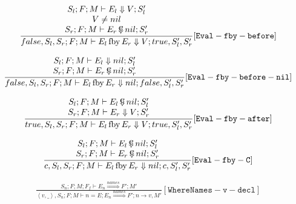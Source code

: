 \documentclass{scrartcl}
\DeclareMathOperator{\fby}{fby}
\DeclareMathOperator{\ceval}{\overset{C}{\smash{\Downarrow}}}
\begin{document}
    \begin{align*}
    \frac{
        \begin{matrix}
        S_l; F; M \vdash E_l \Downarrow V; S_l' \\
        V \neq nil \\
        S_r; F; M \vdash E_r  \ceval nil; S_r'
        \end{matrix}
    }{
        false, S_l, S_r; F; M \vdash E_l \fby E_r \Downarrow V; true, S_l', S_r'
    }[\mathtt{Eval-fby-before}]
    \end{align*}
    
    \begin{align*}
    \frac{
        \begin{matrix}
        S_l; F; M \vdash E_l \Downarrow nil; S_l' \\
        S_r; F; M \vdash E_r  \ceval nil; S_r'
        \end{matrix}
    }{
        false, S_l, S_r; F; M \vdash E_l \fby E_r \Downarrow nil; false, S_l', S_r'
    }[\mathtt{Eval-fby-before-nil}]
    \end{align*}
    
    \begin{align*}
    \frac{
        \begin{matrix}
        S_l; F; M \vdash E_l  \ceval nil; S_l' \\
        S_r; F; M \vdash E_r \Downarrow V; S_r'
        \end{matrix}
    }{
        true, S_l, S_r; F; M \vdash E_l \fby E_r \Downarrow V; true, S_l', S_r'
    }[\mathtt{Eval-fby-after}]
    \end{align*}
    
    \begin{align*}
    \frac{
        \begin{matrix}
        S_l; F; M \vdash E_l  \ceval nil; S_l' \\
        S_r; F; M \vdash E_r  \ceval nil; S_r'
        \end{matrix}
    }{
        c, S_l, S_r; F; M \vdash E_l \fby E_r \Downarrow nil; c, S_l', S_r'
    }[\mathtt{Eval-fby-C}]
    \end{align*}
    
    \begin{align*}
    \frac{
        S_n; F; M; F_f \vdash E_n \overset{names}{\Rightarrow} F'; M'
    }{
        \left<v, \_ \right>, S_n; F; M \vdash n = E; E_n \overset{names}{\Rightarrow} F'; n \to v, M'
    }[\mathtt{WhereNames-v-decl}]
    \end{align*}
    
\end{document}
